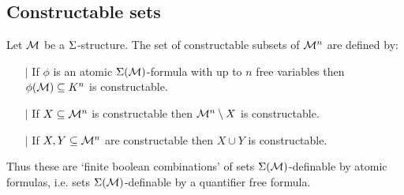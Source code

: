 \subsection{Constructable sets}
\begin{dfn}[Constructable]
    Let $\mathcal{M}$ be a $\Sigma$-structure.
    The set of constructable subsets of $\mathcal{M}^n$ are defined by:
    \begin{itemize}
        \item[$\vert$] If $\phi$ is an atomic $\Sigma(\mathcal{M})$-formula with up to 
            $n$ free variables then $\phi(\mathcal{M}) \subseteq K^n$ is constructable.
        \item[$\vert$] If $X \subseteq \mathcal{M}^n$ is constructable 
            then $\mathcal{M}^n \setminus X$ is constructable. 
        \item[$\vert$] If $X,Y \subseteq \mathcal{M}^n$ are constructable then $X \cup Y$
            is constructable. 
    \end{itemize}
    Thus these are `finite boolean combinations' of sets 
    $\Sigma(\mathcal{M})$-definable by atomic 
    formulas, i.e. sets $\Sigma(\mathcal{M})$-definable by a quantifier free formula.
\end{dfn}

